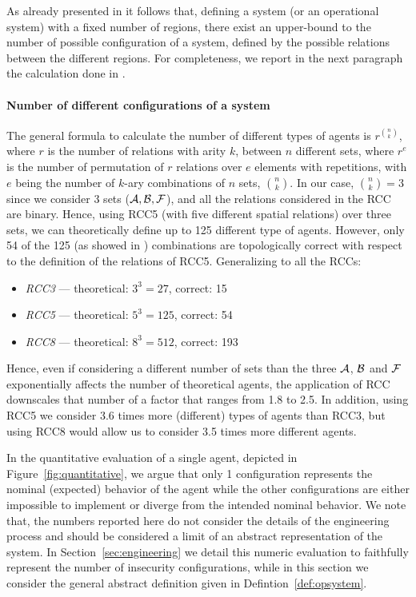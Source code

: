 As already presented in \autocite{Santaca2016abf} it follows that, defining
a system (or an operational system) with a fixed number of regions, there exist
an upper-bound to the number of possible configuration of a system, defined by
the possible relations between the different regions.
For completeness, we report in the next paragraph 
the calculation done in \autocite{Santaca2016abf}.

\paragraph{Number of different configurations of a system}
The general formula to calculate the number of different types of agents is
$r^{\binom{n}{k}}$, where $r$ is the number of relations with arity $k$,
between $n$ different sets, where $r^e$ is the number of permutation of $r$
relations over $e$ elements with repetitions, with $e$ being the number of
$k$-ary combinations of $n$ sets, $\binom{n}{k}$.
In our case, $\binom{n}{k}=3$ since we consider $3$ sets
($\mathcal{A},\mathcal{B},\mathcal{F}$), and all the relations
considered in the RCC are binary.  Hence, using RCC5 (with five different
spatial relations) over three sets, we can theoretically define up to 125
different type of agents. However, only 54 of the 125 (as showed in
\cite{improvingRCC}) combinations are topologically correct with respect to
the definition of the relations of RCC5. Generalizing to all the RCCs:

\begin{itemize}%
\item \emph{RCC3} --- theoretical: $3^3=27$,  correct: 15 
\item \emph{RCC5} --- theoretical: $5^3=125$, correct: 54
\item \emph{RCC8} --- theoretical: $8^3=512$, correct: 193
\end{itemize}

Hence, even if considering a different number of sets than the three
$\mathcal{A}$, $\mathcal{B}$ and $\mathcal{F}$ exponentially affects
the number of theoretical agents, the application of RCC downscales that number
of a factor that ranges from 1.8 to 2.5. In addition, using RCC5 we consider
3.6 times more (different) types of agents than RCC3, but using RCC8 would
allow us to consider 3.5 times more different agents.

In the quantitative evaluation of a single agent, depicted in Figure~\ref{fig:quantitative},
we argue that only 1 configuration represents the nominal (expected) behavior 
of the agent while the other configurations are either impossible to 
implement or diverge from the intended nominal behavior. We note 
that, the numbers reported here do not consider the details of the
engineering process and should be considered a limit of an abstract 
representation of the system. In Section~\ref{sec:engineering} we
detail this numeric evaluation to faithfully represent the
number of insecurity configurations, while in this section we consider
the general abstract definition given in Defintion~\ref{def:opsystem}.

